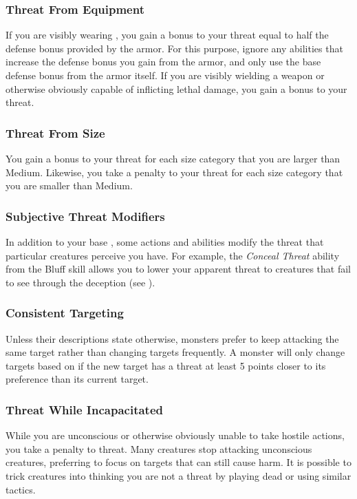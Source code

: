         \subsubsection{Threat From Equipment}
            If you are visibly wearing , you gain a bonus to your threat equal to half the defense bonus provided by the armor.
            For this purpose, ignore any abilities that increase the defense bonus you gain from the armor, and only use the base defense bonus from the armor itself.
            If you are visibly wielding a weapon or otherwise obviously capable of inflicting lethal damage, you gain a  bonus to your threat.

        \subsubsection{Threat From Size}
            You gain a  bonus to your threat for each size category that you are larger than Medium.
            Likewise, you take a  penalty to your threat for each size category that you are smaller than Medium.

        \subsubsection{Subjective Threat Modifiers}
            In addition to your base , some actions and abilities modify the threat that particular creatures perceive you have.
            For example, the \textit{Conceal Threat} ability from the Bluff skill allows you to lower your apparent threat to creatures that fail to see through the deception (see ).

        \subsubsection{Consistent Targeting}
            Unless their descriptions state otherwise, monsters prefer to keep attacking the same target rather than changing targets frequently.
            A monster will only change targets based on  if the new target has a threat at least 5 points closer to its preference than its current target.

        \subsubsection{Threat While Incapacitated}
            While you are unconscious or otherwise obviously unable to take hostile actions, you take a  penalty to threat.
            Many creatures stop attacking unconscious creatures, preferring to focus on targets that can still cause harm.
            It is possible to trick creatures into thinking you are not a threat by playing dead or using similar tactics.


